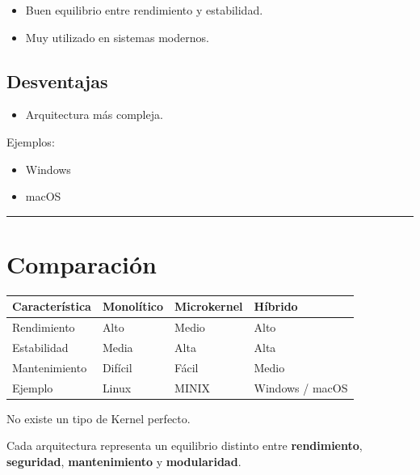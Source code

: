 \documentclass[
  spanish,
  letterpaper,
]{scrbook}
\newcounter{none} %
\providecommand{\tightlist}{%
  \setlength{\itemsep}{0pt}\setlength{\parskip}{0pt}}
\begin{document}
\begin{itemize}
\tightlist
\item
  Buen equilibrio entre rendimiento y estabilidad.
\item
  Muy utilizado en sistemas modernos.
\end{itemize}

\section{Desventajas}\label{desventajas-6}

\begin{itemize}
\tightlist
\item
  Arquitectura más compleja.
\end{itemize}

Ejemplos:

\begin{itemize}
\tightlist
\item
  Windows
\item
  macOS
\end{itemize}

\begin{center}\rule{0.5\linewidth}{0.5pt}\end{center}


\chapter{Comparación}\label{comparaciuxf3n-2}

{\def\LTcaptype{none} %
\begin{longtable}[]{@{}llll@{}}
\toprule\noalign{}
Característica & Monolítico & Microkernel & Híbrido \\
\midrule\noalign{}
\endhead
\bottomrule\noalign{}
\endlastfoot
Rendimiento & Alto & Medio & Alto \\
Estabilidad & Media & Alta & Alta \\
Mantenimiento & Difícil & Fácil & Medio \\
Ejemplo & Linux & MINIX & Windows / macOS \\
\end{longtable}
}

\begin{tcolorbox}[enhanced jigsaw, arc=.35mm, bottomrule=.15mm, bottomtitle=1mm, breakable, colback=white, colbacktitle=quarto-callout-note-color!10!white, colframe=quarto-callout-note-color-frame, coltitle=black, left=2mm, leftrule=.75mm, opacityback=0, opacitybacktitle=0.6, rightrule=.15mm, title=\textcolor{quarto-callout-note-color}{\faInfo}\hspace{0.5em}{Idea clave}, titlerule=0mm, toprule=.15mm, toptitle=1mm]

No existe un tipo de Kernel perfecto.

Cada arquitectura representa un equilibrio distinto entre
\textbf{rendimiento}, \textbf{seguridad}, \textbf{mantenimiento} y
\textbf{modularidad}.

\end{tcolorbox}
\end{document}
